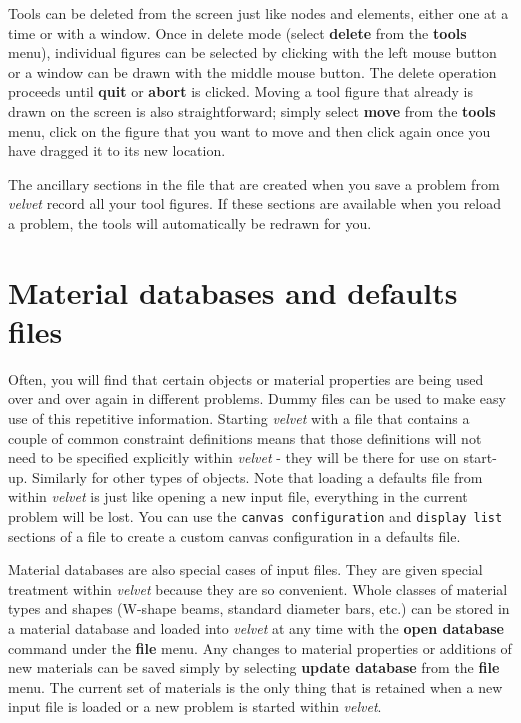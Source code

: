 Tools can be deleted from the screen just like nodes and elements, either 
one at a time or with a window.  Once in delete mode (select {\bf delete}
from the {\bf tools} menu), individual figures can be selected 
by clicking with the left mouse button or a window can be drawn with the middle 
mouse button.  The delete operation proceeds until {\bf quit} or 
{\bf abort} is clicked.	 Moving a tool figure that already
is drawn on the screen is also straightforward; simply select {\bf move} from 
the {\bf tools} menu, click on the figure that you want to move and then 
click again once you have dragged it to its new location.

The ancillary sections in the \felt{} file that are created when you save a 
problem from {\em velvet}
record all your tool figures.  If these sections are available when you reload
a problem, the tools will automatically be redrawn for you.

\section{Material databases and defaults files}

Often, you will find that certain objects or material properties are being 
used over and over again in different problems.  Dummy \felt{} files can be 
used to make easy use of this repetitive information.  Starting {\em velvet} 
with a \felt{} file that contains a couple of common constraint definitions 
means that those definitions will not need to be specified explicitly within 
{\em velvet} - they will be there for use on start-up.  Similarly for other 
types of objects.  Note that loading a defaults file from within {\em velvet} 
is just like opening a new input file, everything in the current problem will 
be lost.  You can use the {\tt canvas configuration} and {\tt display list}
sections of a \felt{} file to create a custom canvas configuration in a 
defaults file.

Material databases are also special cases of \felt{} input files. They are 
given special treatment within {\em velvet} because they are so convenient.  
Whole classes of material types and shapes (W-shape beams, standard diameter
bars, etc.)  can be stored in a material database and loaded into {\em velvet} 
at any time with the {\bf open database} command under the {\bf file} menu.  
Any changes to material properties or additions of new materials 
can be saved simply by selecting {\bf update database} from the {\bf file} menu.  
The current set of materials is the only thing that is retained when a new 
input file is loaded or a new problem is started within {\em velvet}.	

